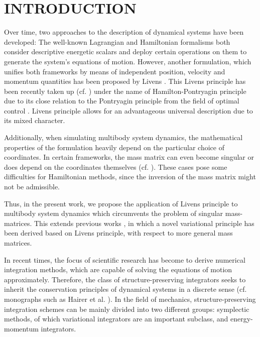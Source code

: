 \documentclass{multibody2023_full_paper}
\begin{document}
\section{INTRODUCTION}
Over time, two approaches to the description of dynamical systems have been developed: The well-known Lagrangian and Hamiltonian formalisms both consider descriptive energetic scalars and deploy certain operations on them to generate the system's equations of motion. However, another formulation, which unifies both frameworks by means of independent position, velocity and momentum quantities has been proposed by Livens \cite{livens_hamiltons_1919}. This Livens principle has been recently taken up (cf. \cite{bou-rabee_hamiltonpontryagin_2009,holm_geometric_2011}) under the name of Hamilton-Pontryagin principle due to its close relation to the Pontryagin principle from the field of optimal control \cite{pontryagin_mathematical_1962}. Livens principle allows for an advantageous universal description due to its mixed character.

Additionally, when simulating multibody system dynamics, the mathematical properties of the formulation heavily depend on the particular choice of coordinates. In certain frameworks, the mass matrix can even become singular or does depend on the coordinates themselves (cf. \cite{udwadia06, garcia_de_jalon13}). These cases pose some difficulties for Hamiltonian methods, since the inversion of the mass matrix might not be admissible.

Thus, in the present work, we propose the application of Livens principle to multibody system dynamics which circumvents the problem of singular mass-matrices. This extends previous works \cite{kinon_ggl_2023, kinon_structure_2023}, in which a novel variational principle has been derived based on Livens principle, with respect to more general mass matrices.

In recent times, the focus of scientific research has become to derive numerical integration methods, which are capable of solving the equations of motion approximately. Therefore, the class of structure-preserving integrators seeks to inherit the conservation principles of dynamical systems in a discrete sense (cf. monographs such as Hairer et al. \cite{hairer_geometric_2006}). In the field of mechanics, structure-preserving integration schemes can be mainly divided into two different groups: symplectic methods, of which variational integrators are an important subclass, and energy-momentum integrators.
\end{document}
